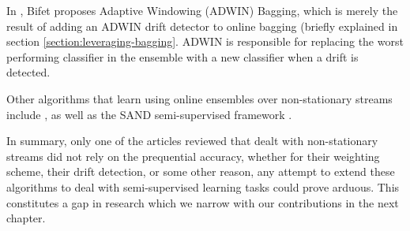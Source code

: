 In \cite{bifet2009new}, Bifet proposes Adaptive Windowing (ADWIN) Bagging, which is merely the result of adding an ADWIN drift detector to online bagging (briefly explained in section \ref{section:leveraging-bagging}. ADWIN is responsible for replacing the worst performing classifier in the ensemble with a new classifier when a drift is detected.

Other algorithms that learn using online ensembles over non-stationary streams include \cite{BRZEZINSKI201450, Kolter:2005:UAE:1102351.1102408, Kolter20072755, kuncheva2004classifier, minku2012ddd, stanley2003learning, yoshida2011adaptive}, as well as  the SAND semi-supervised framework \cite{haque2015sand}.

In summary, only one of the articles reviewed that dealt with non-stationary streams did not rely on the prequential accuracy, whether for their weighting scheme, their drift detection, or some other reason, any attempt to extend these algorithms to deal with semi-supervised learning tasks could prove arduous. This constitutes a gap in research which we narrow with our contributions in the next chapter.